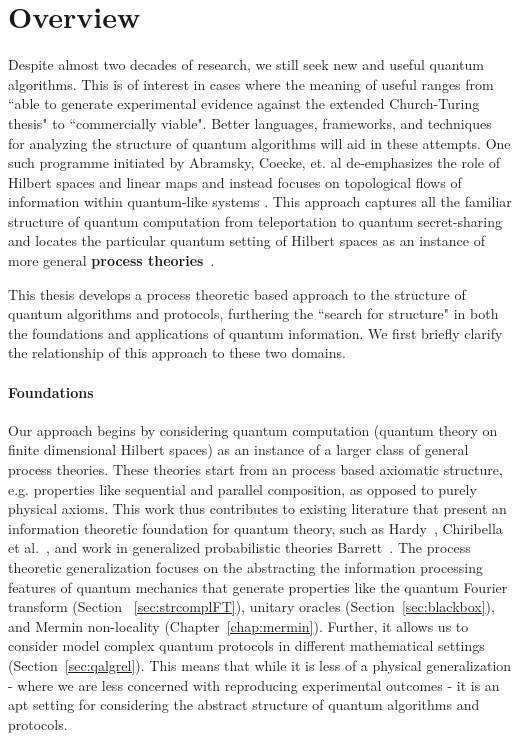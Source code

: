 \chapter{Overview}

Despite almost two decades of research, we still seek new and useful quantum algorithms.  This is of interest in cases where the meaning of useful ranges from ``able to generate experimental evidence against the extended Church-Turing thesis" to ``commercially viable". Better languages, frameworks, and techniques for analyzing the structure of quantum algorithms will aid in these attempts.  One such  programme initiated by Abramsky, Coecke, et. al de-emphasizes the role of Hilbert spaces and linear maps and instead focuses on topological flows of information within quantum-like systems
\cite{abramsky2008categorical,coecke2011interacting,coecke2013new}. This approach captures all the familiar structure of quantum computation from teleportation  to quantum secret-sharing and locates the particular quantum setting of Hilbert spaces as an instance of more general
\textbf{process theories}~\cite{coecke2015generalised,qcs-notes,coecke2011categories}. 

This thesis develops a process theoretic based approach to the structure of quantum algorithms and protocols, furthering the ``search for structure" in both the foundations and applications of quantum information. We first briefly clarify the relationship of this approach to these two domains.
 
\subsubsection*{Foundations}

Our approach begins by considering quantum computation (quantum theory on finite dimensional Hilbert spaces) as an instance of a larger class of general process theories. These theories start from an process based axiomatic structure, e.g. properties like sequential and parallel composition, as opposed to purely physical axioms. This work thus contributes to existing literature that present an information theoretic foundation for quantum theory, such as Hardy~\cite{hardy2001quantum}, Chiribella et al.~\cite{chiribella2011informational}, and work in generalized probabilistic theories Barrett~\cite{barrett2007information}.  The process theoretic generalization focuses on the abstracting the information processing features of quantum mechanics that generate properties like the quantum Fourier transform (Section ~\ref{sec:strcomplFT}), unitary oracles (Section~\ref{sec:blackbox}), and Mermin non-locality (Chapter~\ref{chap:mermin}). Further, it allows us to consider model complex quantum protocols in different mathematical settings (Section~\ref{sec:qalgrel}). This means that while it is less of a physical generalization - where we are less concerned
with reproducing experimental outcomes - it is an apt setting for considering the abstract structure of quantum algorithms and protocols.

